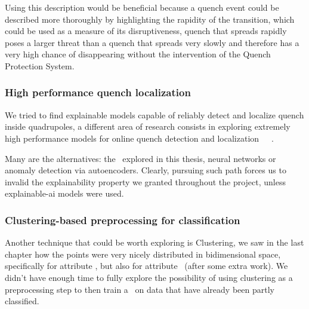 Using this description would be beneficial because a quench event could be described more thoroughly
by highlighting the rapidity of the transition, which could be used as a measure of its
disruptiveness, quench that spreads rapidly poses a larger threat than a quench that spreads very
slowly and therefore has a very high chance of disappearing without the intervention of the
Quench Protection System.

\subsubsection{High performance quench localization}
We tried to find explainable models capable of reliably detect and localize quench inside
quadrupoles, a different area of research consists in exploring extremely high performance models
for online quench detection and localization~\cite{hoang2021}~\cite{zhou2021}~\cite{einstein2023}.

Many are the alternatives: the \svcs\ explored in this thesis, neural networks or anomaly detection
via autoencoders. Clearly, pursuing such path forces us to invalid the explainability property we
granted throughout the project, unless explainable-ai models were used.

\subsubsection{Clustering-based preprocessing for classification}
Another technique that could be worth exploring is Clustering, we saw in the last chapter how the
points were very nicely distributed in bidimensional space, specifically for attribute \an, but also
for attribute \cnmod\ (after some extra work). We didn't have enough time to fully explore the
possibility of using clustering as a preprocessing step to then train a \dt\ on data that have
already been partly classified.
